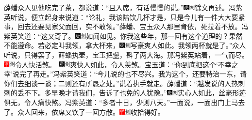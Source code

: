 薛蟠众人见他吃完了茶，都说道：“且入席，有话慢慢的说。”{\includegraphics[width=3mm]{../Images/00004}\includegraphics[width=3mm]{../Images/00011}\footnotesize \kaishu 馀文再述。}冯紫英听说，便立起身来说道：“论礼，我该陪饮几杯才是，只是今儿有一件大大要紧事，回去还要见家父面回，实不敢领。”薛蟠、宝玉众人那里肯依，死拉着不放。冯紫英笑道：“这又奇了。{\includegraphics[width=3mm]{../Images/00004}\includegraphics[width=3mm]{../Images/00011}\footnotesize \kaishu 如闻如见。}你我这些年，那一回有这个道理的？果然不能遵命。若必定叫我领，拿大杯来，{\includegraphics[width=3mm]{../Images/00004}\includegraphics[width=3mm]{../Images/00011}\footnotesize \kaishu 写豪爽人如此。}我领两杯就是了。”众人听说，只得罢了，薛蟠执壶，宝玉把盏，斟了两大海。那冯紫英站着，一气而尽。{\includegraphics[width=3mm]{../Images/00002}\includegraphics[width=3mm]{../Images/00011}\footnotesize \kaishu 令人快活煞。　\includegraphics[width=3mm]{../Images/00004}\includegraphics[width=3mm]{../Images/00011}\footnotesize \kaishu 爽快人如此，令人羡煞。}宝玉道：“你到底把这个‘不幸之幸’说完了再走。”冯紫英笑道：“今儿说的也不尽兴。我为这个，还要特治一东，请你们去细谈一谈；二则还有所恳之处。”说着执手就走。薛蟠道：“越发说的人热剌剌的丢不下。多早晚才请我们，告诉了也免的人犹豫。”{\includegraphics[width=3mm]{../Images/00004}\includegraphics[width=3mm]{../Images/00011}\footnotesize \kaishu 实心人如此，丝毫形迹俱无，令人痛快煞。}冯紫英道：“多者十日，少则八天。”一面说，一面出门上马去了。众人回来，依席又饮了一回方散。{\includegraphics[width=3mm]{../Images/00002}\includegraphics[width=3mm]{../Images/00011}\footnotesize \kaishu 收拾得好。}

